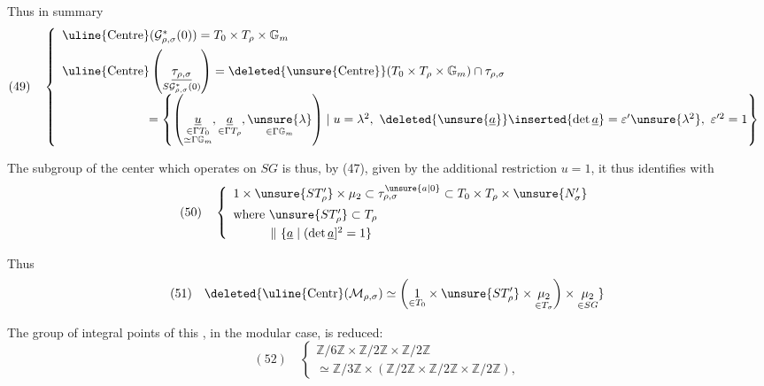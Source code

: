 
Thus in summary
\[
(49)\quad
\left\{
\begin{array}{l}
\uline{\mathrm{Centre}}(\mathcal G^*_{\rho,\sigma}(0))=T_0\times T_\rho\times\mathbb G_m\\[5pt]
\uline{\mathrm{Centre}}\left(\underset{S\mathcal G^*_{\rho,\sigma}(0)}{\underline{\tau_{\rho,\sigma}}}\right)
=\deleted{\unsure{\mathrm{Centre}}}(T_0\times T_\rho\times\mathbb G_m)\cap\tau_{\rho,\sigma}\\[7pt]
\hspace{7em}=\left\{\left(
\underset{\substack{\in\Gamma T_0\\\simeq\Gamma\mathbb G_m}}{\underline u},
\underset{\in\Gamma T_\rho}{\underline a},
\underset{\in\Gamma\mathbb G_m}{\unsure{\lambda}}
\right)\mid u=\lambda^2,\ \deleted{\unsure{\underline a}}\inserted{\det\underline a}=\varepsilon'\unsure{\lambda^2},\ \varepsilon'^2=1\right\}
\end{array}\right.
\]

The subgroup of the center which operates  on $SG$ is thus, by (47), given by the additional restriction $u=1$, it thus identifies with 
\[
(50)\quad
\left\{
\begin{array}{l}
1\times\unsure{ST'_\rho}\times\mu_2\subset\tau^{\unsure{a|0}}_{\rho,\sigma}\subset T_0\times T_\rho\times\unsure{N'_\sigma}\\[5pt]
\text{where }\unsure{ST'_\rho}\subset T_\rho\\[3pt]
\hspace{3em}\Vert\ \{\underline a\mid(\det\underline a]^2=1\}
\end{array}\right.
\]

Thus
\[
(51)\quad
\deleted{\uline{\mathrm{Centr}}(\mathcal M_{\rho,\sigma})\simeq
\left(\underset{\in T_0}{1}\times\unsure{ST'_\rho}\times\underset{\in T_\sigma}{\mu_2}\right)\times\underset{\in SG}{\mu_2}}
\]

The group of integral points of this , in the modular case, is reduced:
\[
(52)\quad
\left\{
\begin{array}{l}
\mathbb Z/6\mathbb Z\times\mathbb Z/2\mathbb Z\times\mathbb Z/2\mathbb Z\\[4pt]
\simeq\mathbb Z/3\mathbb Z\times(\mathbb Z/2\mathbb Z\times\mathbb Z/2\mathbb Z\times\mathbb Z/2\mathbb Z),
\end{array}\right.
\]

